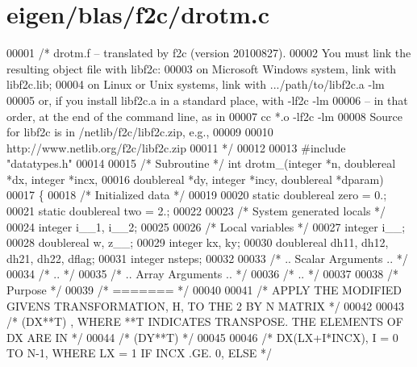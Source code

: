 \hypertarget{eigen_2blas_2f2c_2drotm_8c_source}{}\section{eigen/blas/f2c/drotm.c}
\label{eigen_2blas_2f2c_2drotm_8c_source}

\begin{DoxyCode}
00001 \textcolor{comment}{/* drotm.f -- translated by f2c (version 20100827).}
00002 \textcolor{comment}{   You must link the resulting object file with libf2c:}
00003 \textcolor{comment}{    on Microsoft Windows system, link with libf2c.lib;}
00004 \textcolor{comment}{    on Linux or Unix systems, link with .../path/to/libf2c.a -lm}
00005 \textcolor{comment}{    or, if you install libf2c.a in a standard place, with -lf2c -lm}
00006 \textcolor{comment}{    -- in that order, at the end of the command line, as in}
00007 \textcolor{comment}{        cc *.o -lf2c -lm}
00008 \textcolor{comment}{    Source for libf2c is in /netlib/f2c/libf2c.zip, e.g.,}
00009 \textcolor{comment}{}
00010 \textcolor{comment}{        http://www.netlib.org/f2c/libf2c.zip}
00011 \textcolor{comment}{*/}
00012 
00013 \textcolor{preprocessor}{#include "datatypes.h"}
00014 
00015 \textcolor{comment}{/* Subroutine */} \textcolor{keywordtype}{int} drotm\_(integer *n, doublereal *dx, integer *incx, 
00016     doublereal *dy, integer *incy, doublereal *dparam)
00017 \{
00018     \textcolor{comment}{/* Initialized data */}
00019 
00020     \textcolor{keyword}{static} doublereal zero = 0.;
00021     \textcolor{keyword}{static} doublereal two = 2.;
00022 
00023     \textcolor{comment}{/* System generated locals */}
00024     integer i\_\_1, i\_\_2;
00025 
00026     \textcolor{comment}{/* Local variables */}
00027     integer i\_\_;
00028     doublereal w, z\_\_;
00029     integer kx, ky;
00030     doublereal dh11, dh12, dh21, dh22, dflag;
00031     integer nsteps;
00032 
00033 \textcolor{comment}{/*     .. Scalar Arguments .. */}
00034 \textcolor{comment}{/*     .. */}
00035 \textcolor{comment}{/*     .. Array Arguments .. */}
00036 \textcolor{comment}{/*     .. */}
00037 
00038 \textcolor{comment}{/*  Purpose */}
00039 \textcolor{comment}{/*  ======= */}
00040 
00041 \textcolor{comment}{/*     APPLY THE MODIFIED GIVENS TRANSFORMATION, H, TO THE 2 BY N MATRIX */}
00042 
00043 \textcolor{comment}{/*     (DX**T) , WHERE **T INDICATES TRANSPOSE. THE ELEMENTS OF DX ARE IN */}
00044 \textcolor{comment}{/*     (DY**T) */}
00045 
00046 \textcolor{comment}{/*     DX(LX+I*INCX), I = 0 TO N-1, WHERE LX = 1 IF INCX .GE. 0, ELSE */}

\end{DoxyCode}
